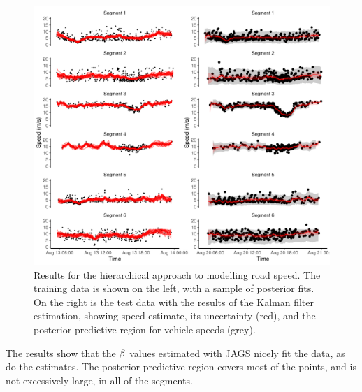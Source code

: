 \begin{knitrout}\small
{}\color{fgcolor}\begin{figure}
\includegraphics[width=\textwidth]{figure/nw_model_n2_kf-1} \caption[Results for the hierarchical approach to modelling road speed]{Results for the hierarchical approach to modelling road speed. The training data is shown on the left, with a sample of posterior fits. On the right is the test data with the results of the Kalman filter estimation, showing speed estimate, its uncertainty (red), and the posterior predictive region for vehicle speeds (grey).}\label{fig:nw_model_n2_kf}
\end{figure}


\end{knitrout}

The results show that the $\beta$ values estimated with JAGS nicely fit the data, as do the \kf{} estimates. The posterior predictive region covers most of the points, and is not excessively large, in all of the segments.
